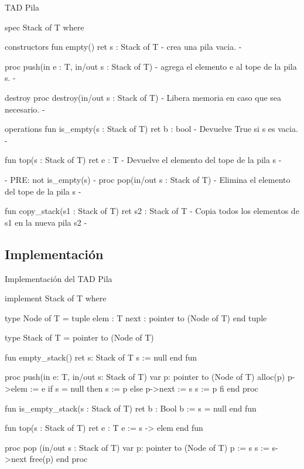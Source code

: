 \begin{codebox}{TAD Pila}
\begin{pascallike}
spec Stack of T where

constructors
    fun empty() ret s : Stack of T
    {- crea una pila vacia. -}

    proc push(in e : T, in/out s : Stack of T)
    {- agrega el elemento e al tope de la pila s. -}

destroy
    proc destroy(in/out s : Stack of T)
    {- Libera memoria en caso que sea necesario. -}

operations
    fun is_empty(s : Stack of T) ret b : bool
    {- Devuelve True si s es vacia. -}

    fun top(s : Stack of T) ret e : T
    {- Devuelve el elemento del tope de la pila s -}

    {- PRE: not is_empty(s) -}
    proc pop(in/out s : Stack of T)
    {- Elimina el elemento del tope de la pila s -}

    fun copy_stack(s1 : Stack of T) ret s2 : Stack of T
    {- Copia todos los elementos de s1 en la nueva pila s2 -}
\end{pascallike}
\end{codebox}

\subsection{Implementación}

\begin{codebox}{Implementación del TAD Pila}
\begin{pascallike}
implement Stack of T where

type Node of T = tuple
                    elem : T
                    next : pointer to (Node of T)
                 end tuple

type Stack of T = pointer to (Node of T)

fun empty_stack() ret s: Stack of T
    s := null
end fun

proc push(in e: T, in/out s: Stack of T)
    var p: pointer to (Node of T)
    alloc(p)
    p->elem := e
    if s = null then
        s := p
    else
        p->next := s
        s := p
    fi
end proc 

fun is_empty_stack(s : Stack of T) ret b : Bool
    b := s = null
end fun

fun top(s : Stack of T) ret e : T
    e := s -> elem
end fun

proc pop (in/out s : Stack of T)
    var p: pointer to (Node of T)
    p := s
    s := s->next
    free(p)
end proc
\end{pascallike}
\end{codebox}

